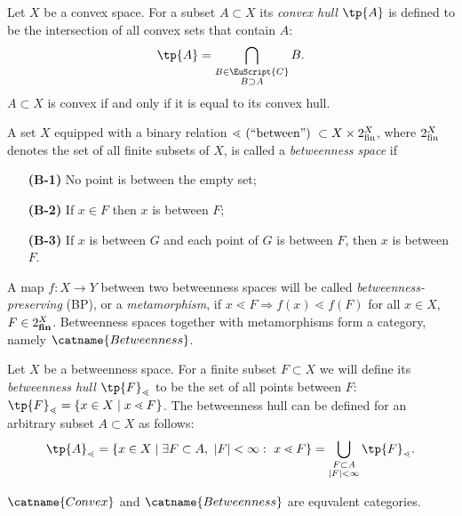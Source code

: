 \documentclass[12pt, a4paper]{article}
\newcommand{\C}{\EuScript{C}}
\newcommand{\btw}{\lessdot}
\begin{document}
\begin{definition}
    Let \(X\) be a convex space. For a subset \(A \subset X\) its \textit{convex hull} \(\tp{A}\) is defined to be the intersection of all convex sets that contain \(A\): \[\tp{A} = \bigcap\limits_{\substack{B \in \C \\ B \supset A}} B.\] \(A \subset X\) is convex if and only if it is equal to its convex hull.
\end{definition}

\begin{definition}\label{def-btw}
    A set \(X\) equipped with a binary relation \(\btw \hbox{ (``between'') } \subset X \times 2^X_{\rm fin}\), where \(2^X_{\rm fin}\) denotes the set of all finite subsets of \(X\), is called a \textit{betweenness space} if

    \begin{itemize}
        \item[\bf (B-1)] No point is between the empty set;
        \item[\bf (B-2)] If \(x \in F\) then \(x\) is between \(F\);
        \item[\bf (B-3)] If \(x\) is between \(G\) and each point of \(G\) is between \(F\), then \(x\) is between \(F\).  
    \end{itemize}

    A map \(f \colon X \to Y\) between two betweenness spaces will be called \textit{betweenness-preserving} (BP), or a \textit{metamorphism}, if \(x \btw F \Rightarrow f(x) \btw f(F)\) for all \(x \in X\), \(F \in 2^X_{\bf fin}\). Betweenness spaces together with metamorphisms form a category, namely \(\catname{Betweenness}\).
\end{definition}

\begin{definition}
    Let \(X\) be a betweenness space. For a finite subset \(F \subset X\) we will define its \textit{betweenness hull} \(\tp{F}_\btw\) to be the set of all points between \(F\): \(\tp{F}_\btw = \{x \in X \mid x \btw F\}\). The betweenness hull can be defined for an arbitrary subset \(A \subset X\) as follows: \[\tp{A}_\btw = \{x \in X \mid \exists F \subset A,\ |F| < \infty: \ x \btw F\} = \bigcup\limits_{\substack{F \subset A \\ |F| < \infty}} \tp{F}_\btw.\]
\end{definition}

\begin{theorem}\label{th-equivalent}
    \(\catname{Convex}\) and \(\catname{Betweenness}\) are equvalent categories.
\end{theorem}
\end{document}
